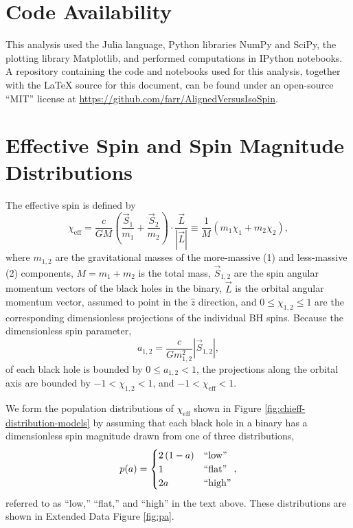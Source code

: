 \documentclass{nature}
\newcommand{\chieff}{\chi_\mathrm{eff}}
\begin{document}
\begin{methods}

\setcounter{figure}{0}
\renewcommand{\figurename}{Extended Data Figure}

\section{Code Availability}

This analysis used the Julia language\cite{Julia}, Python libraries
NumPy and SciPy\cite{NumPy,SciPy}, the plotting library
Matplotlib\cite{Matplotlib}, and performed computations in IPython
notebooks\cite{IPython}.  A repository containing the code and
notebooks used for this analysis, together with the \LaTeX{} source
for this document, can be found under an open-source ``MIT'' license
at \url{https://github.com/farr/AlignedVersusIsoSpin}.

\section{Effective Spin and Spin Magnitude Distributions}
\label{methsec:chieff-spin-magnitude}

The effective spin is defined by\cite{2016PhRvL.116x1102A} 
\begin{equation}
  \chieff = \frac{c}{GM} \left( \frac{\vec{S}_1}{m_1} + \frac{\vec{S}_2}{m_2}
  \right) \cdot \frac{\vec{L}}{\left| \vec{L} \right|} \equiv \frac{1}{M} \left( m_1 \chi_1 + m_2 \chi_2 \right),
\end{equation}
where $m_{1,2}$ are the gravitational masses of the more-massive (1)
and less-massive (2) components, $M = m_1 + m_2$ is the total mass,
$\vec{S}_{1,2}$ are the spin angular momentum vectors of the black
holes in the binary, $\vec{L}$ is the orbital angular momentum vector,
assumed to point in the $\hat{z}$ direction, and
$0 \leq \chi_{1,2} \leq 1$ are the corresponding dimensionless
projections of the individual \ac{BH} spins.  Because the
dimensionless spin parameter,
\begin{equation}
  \label{eq:a-def}
  a_{1,2} = \frac{c}{G m_{1,2}^2} \left|\vec{S}_{1,2} \right|,
\end{equation}
of each black hole is bounded by $0 \leq a_{1,2} < 1$, the projections
along the orbital axis are bounded by $-1 < \chi_{1,2} < 1$, and
$-1 < \chieff < 1$.

We form the population distributions of $\chieff$ shown in Figure
\ref{fig:chieff-distribution-models} by assuming that each black hole
in a binary has a dimensionless spin magnitude drawn from one of three
distributions,
\begin{equation}
  \label{eq:magnitude-dists}
  p(a) = \begin{cases}
    2\left(1-a \right) & \textnormal{``low''} \\
    1 & \textnormal{``flat''} \\
    2 a & \textnormal{``high''}
  \end{cases},
\end{equation}
referred to as ``low,'' ``flat,'' and ``high'' in the text above.
These distributions are shown in Extended Data Figure \ref{fig:pa}.


\end{methods}
\end{document}
